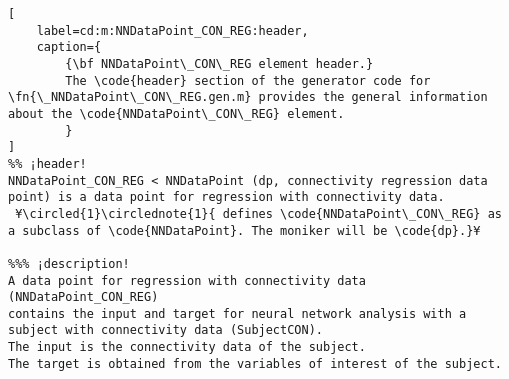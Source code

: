\documentclass{tufte-handout}
\begin{document}
\begin{lstlisting}[
	label=cd:m:NNDataPoint_CON_REG:header,
	caption={
		{\bf NNDataPoint\_CON\_REG element header.}
		The \code{header} section of the generator code for \fn{\_NNDataPoint\_CON\_REG.gen.m} provides the general information about the \code{NNDataPoint\_CON\_REG} element.
		}
]
%% ¡header!
NNDataPoint_CON_REG < NNDataPoint (dp, connectivity regression data point) is a data point for regression with connectivity data.
 ¥\circled{1}\circlednote{1}{ defines \code{NNDataPoint\_CON\_REG} as a subclass of \code{NNDataPoint}. The moniker will be \code{dp}.}¥

%%% ¡description!
A data point for regression with connectivity data (NNDataPoint_CON_REG) 
contains the input and target for neural network analysis with a subject with connectivity data (SubjectCON).
The input is the connectivity data of the subject.
The target is obtained from the variables of interest of the subject.
\end{lstlisting}
\end{document}

